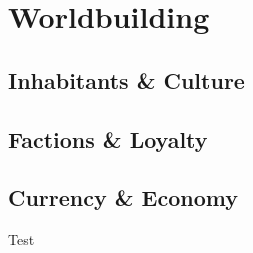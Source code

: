 
\chapter{Worldbuilding}
\section{Inhabitants \& Culture}
\section{Factions \& Loyalty}
\section{Currency \& Economy}
Test

